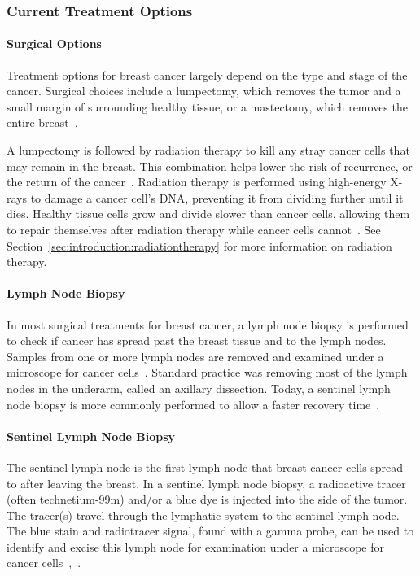 \subsubsection{Current Treatment Options\label{sec:introduction:breastcancer:currenttreatmentoptions}}

\paragraph*{Surgical Options\label{sec:introduction:breastcancer:currenttreatmentoptions:surgicaloptions}}

Treatment options for breast cancer largely depend on the type and stage of the cancer. Surgical choices include a lumpectomy, which removes the tumor and a small margin of surrounding healthy tissue, or a mastectomy, which removes the entire breast~\cite{RefWorks:RefID:165-czajka2023breast}.

A lumpectomy is followed by radiation therapy to kill any stray cancer cells that may remain in the breast. This combination helps lower the risk of recurrence, or the return of the cancer~\cite{RefWorks:RefID:159-depolo2024radiation}. Radiation therapy is performed using high-energy X-rays to damage a cancer cell's DNA, preventing it from dividing further until it dies. Healthy tissue cells grow and divide slower than cancer cells, allowing them to repair themselves after radiation therapy while cancer cells cannot~\cite{RefWorks:RefID:159-depolo2024radiation}. See Section~\ref{sec:introduction:radiationtherapy} for more information on radiation therapy.

\paragraph*{Lymph Node Biopsy\label{sec:introduction:breastcancer:currenttreatmentoptions:lymphnodebiopsy}}
In most surgical treatments for breast cancer, a lymph node biopsy is performed to check if cancer has spread past the breast tissue and to the lymph nodes. Samples from one or more lymph nodes are removed and examined under a microscope for cancer cells~\cite{RefWorks:RefID:37-memorialsurgery}. Standard practice was removing most of the lymph nodes in the underarm, called an axillary dissection. Today, a sentinel lymph node biopsy is more commonly performed to allow a faster recovery time~\cite{RefWorks:RefID:37-memorialsurgery}.

\paragraph*{Sentinel Lymph Node Biopsy\label{sec:introduction:breastcancer:currenttreatmentoptions:sentinellymphnodebiopsy}}
The sentinel lymph node is the first lymph node that breast cancer cells spread to after leaving the breast. In a sentinel lymph node biopsy, a radioactive tracer (often technetium-99m) and/or a blue dye is injected into the side of the tumor. The tracer(s) travel through the lymphatic system to the sentinel lymph node. The blue stain and radiotracer signal, found with a gamma probe, can be used to identify and excise this lymph node for examination under a microscope for cancer cells~\cite{RefWorks:RefID:37-memorialsurgery},~\cite{RefWorks:RefID:165-czajka2023breast}.

